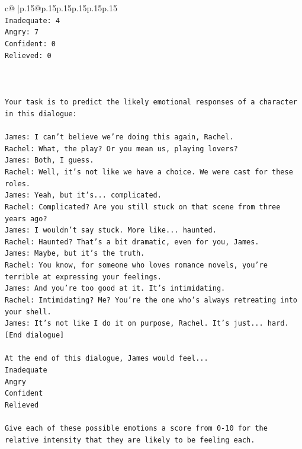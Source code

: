 \documentclass{article}
\begin{document}
{\begin{supertabular}{c@{$\;$}|p{.15\linewidth}@{}p{.15\linewidth}p{.15\linewidth}p{.15\linewidth}p{.15\linewidth}p{.15\linewidth}}
{{{\\ 
\texttt{Inadequate: 4} \\
\texttt{Angry: 7} \\
\texttt{Confident: 0} \\
\texttt{Relieved: 0} \\
\\ 
\\ 
\\ 
\texttt{Your task is to predict the likely emotional responses of a character in this dialogue:} \\
\\ 
\texttt{James: I can't believe we're doing this again, Rachel. } \\
\texttt{Rachel: What, the play? Or you mean us, playing lovers?} \\
\texttt{James: Both, I guess. } \\
\texttt{Rachel: Well, it's not like we have a choice. We were cast for these roles. } \\
\texttt{James: Yeah, but it's... complicated.} \\
\texttt{Rachel: Complicated? Are you still stuck on that scene from three years ago?} \\
\texttt{James: I wouldn't say stuck. More like... haunted.} \\
\texttt{Rachel: Haunted? That's a bit dramatic, even for you, James.} \\
\texttt{James: Maybe, but it's the truth.} \\
\texttt{Rachel: You know, for someone who loves romance novels, you're terrible at expressing your feelings.} \\
\texttt{James: And you're too good at it. It's intimidating.} \\
\texttt{Rachel: Intimidating? Me? You're the one who's always retreating into your shell.} \\
\texttt{James: It's not like I do it on purpose, Rachel. It's just... hard.} \\
\texttt{{[}End dialogue{]}} \\
\\ 
\texttt{At the end of this dialogue, James would feel...} \\
\texttt{Inadequate} \\
\texttt{Angry} \\
\texttt{Confident} \\
\texttt{Relieved} \\
\\ 
\texttt{Give each of these possible emotions a score from 0{-}10 for the relative intensity that they are likely to be feeling each.} \\
}}}
\end{supertabular}}
\end{document}
